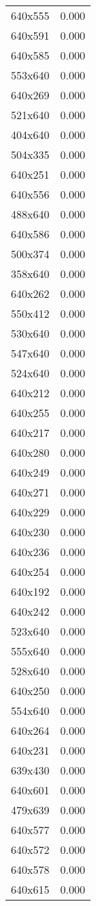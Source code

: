 \begin{table}
\begin{tabular}{lr}
640x555 & 0.000 \\
640x591 & 0.000 \\
640x585 & 0.000 \\
553x640 & 0.000 \\
640x269 & 0.000 \\
521x640 & 0.000 \\
404x640 & 0.000 \\
504x335 & 0.000 \\
640x251 & 0.000 \\
640x556 & 0.000 \\
488x640 & 0.000 \\
640x586 & 0.000 \\
500x374 & 0.000 \\
358x640 & 0.000 \\
640x262 & 0.000 \\
550x412 & 0.000 \\
530x640 & 0.000 \\
547x640 & 0.000 \\
524x640 & 0.000 \\
640x212 & 0.000 \\
640x255 & 0.000 \\
640x217 & 0.000 \\
640x280 & 0.000 \\
640x249 & 0.000 \\
640x271 & 0.000 \\
640x229 & 0.000 \\
640x230 & 0.000 \\
640x236 & 0.000 \\
640x254 & 0.000 \\
640x192 & 0.000 \\
640x242 & 0.000 \\
523x640 & 0.000 \\
555x640 & 0.000 \\
528x640 & 0.000 \\
640x250 & 0.000 \\
554x640 & 0.000 \\
640x264 & 0.000 \\
640x231 & 0.000 \\
639x430 & 0.000 \\
640x601 & 0.000 \\
479x639 & 0.000 \\
640x577 & 0.000 \\
640x572 & 0.000 \\
640x578 & 0.000 \\
640x615 & 0.000 \\

\end{tabular}
\end{table}
